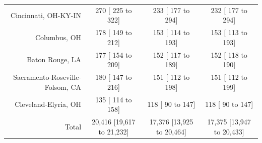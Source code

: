 \documentclass{article}
\begin{document}
\begin{table}[H]
\begin{tabular}{|r|c|c|c|}
		Cincinnati, OH-KY-IN &    270 [   225 to    322] &    233 [   177 to    294] &    232 [   177 to    294]\\
		Columbus, OH &    178 [   149 to    212] &    153 [   114 to    193] &    153 [   113 to    193]\\
		Baton Rouge, LA &    177 [   154 to    209] &    152 [   117 to    189] &    152 [   118 to    190]\\
		Sacramento-Roseville-Folsom, CA &    180 [   147 to    216] &    151 [   112 to    198] &    151 [   112 to    199]\\
		Cleveland-Elyria, OH &    135 [   114 to    158] &    118 [    90 to    147] &    118 [    90 to    147]\\
		\hline
		Total & 20,416 [19,617 to 21,232] & 17,376 [13,925 to 20,464] & 17,375 [13,947 to 20,433]\\
		\hline
	\end{tabular}
\end{table}
\end{document}
